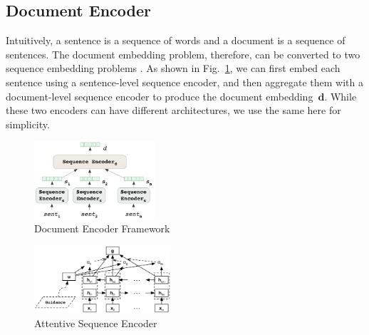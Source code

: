 \subsection{Document Encoder}
\label{sec_doc_encoder}
Intuitively, a sentence is a sequence of words and a document is a sequence of sentences. %
The document embedding problem, therefore, can be converted to two sequence embedding problems \cite{tang2015document,yang2016hierarchical}. As shown in Fig.~\ref{fig_doc_encoder}, we can first embed each 
sentence using a sentence-level sequence encoder, and then aggregate them with a document-level sequence 
encoder to produce the document embedding~$\mathbf{d}$. 
While these two encoders can have different architectures, we use the same here for simplicity.

\vspace{-.5em}
\begin{figure}[htbp]
\begin{center}
\includegraphics[width=0.4\textwidth]{figures/document_encoder.png}	
\caption{Document Encoder Framework}
\label{fig_doc_encoder}
\end{center}
\end{figure}
%
\vspace{-.5em}
\begin{figure}[htbp]
\begin{center}
\includegraphics[width=0.45\textwidth]{figures/attentive_seq_encoder.png}	
\caption{Attentive Sequence Encoder}
\label{fig_seq_encoder}
\end{center}
\end{figure}


